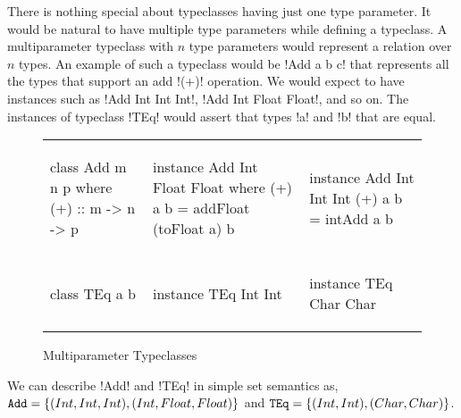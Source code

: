 \documentclass[format=acmsmall,manuscript,review,screen,nonacm,margin=1in,11pt]{acmart}
\begin{document}
There is nothing special about typeclasses having just one type parameter. 
It would be natural to have multiple type parameters while defining a typeclass.
A multiparameter typeclass with $n$ type parameters would represent a relation over $n$ types.
An example of such a typeclass would be !Add a b c! that represents
all the types that support an add !(+)! operation. We would expect to have instances such as !Add Int Int Int!, 
!Add Int Float Float!, and so on. The instances of typeclass !TEq! would assert that types !a! and !b! that are equal.
\begin{figure}[ht]
  \footnotesize
  \begin{tabular}{l l l}
\begin{code}
class Add m n p where
  (+) :: m -> n -> p
\end{code}&%
\begin{code}
instance Add Int Float Float where
  (+) a b = addFloat (toFloat a) b
\end{code}&%
\begin{code}
instance Add Int Int Int
  (+) a b = intAdd a b
\end{code}\\
\begin{code}
class TEq a b
\end{code}&%
\begin{code}
instance TEq Int Int
\end{code}&%
\begin{code}
instance TEq Char Char
\end{code}%
  \end{tabular}
  \caption{Multiparameter Typeclasses}
  \label{fig:multip-typeclass}
\end{figure}
We can describe !Add! and !TEq! in simple set semantics as, $\texttt{Add} = \{(Int, Int, Int), (Int, Float, Float)\}$
and $\texttt{TEq} = \{(Int, Int),(Char, Char)\}$. %
\end{document}
